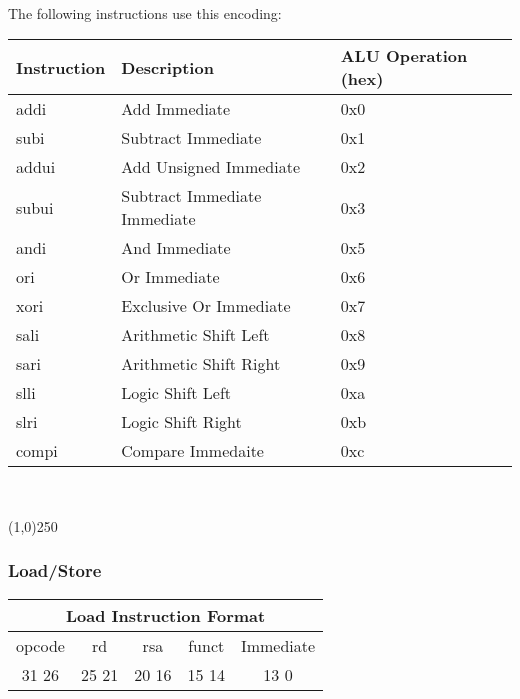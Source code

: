 \documentclass[letterpaper, 11pt]{article}
\begin{document}
\paragraph{}The following instructions use this encoding:
\begin{center}
	\begin{tabular}{|l|l|l|} \hline
			Instruction & Description 						& ALU Operation (hex) \\ \hline
			addi		& Add Immediate						& 0x0 \\ \hline
			subi 		& Subtract Immediate				& 0x1 \\ \hline
			addui 		& Add Unsigned Immediate			& 0x2 \\ \hline
			subui		& Subtract Immediate Immediate 	& 0x3 \\ \hline
			andi		& And Immediate						& 0x5 \\ \hline
			ori			& Or Immediate						& 0x6 \\ \hline
			xori		& Exclusive Or Immediate			& 0x7 \\ \hline
			sali		& Arithmetic Shift Left				& 0x8 \\ \hline
			sari		& Arithmetic Shift Right			& 0x9 \\ \hline
			slli		& Logic Shift Left 					& 0xa \\ \hline
			slri		& Logic Shift Right					& 0xb \\ \hline
			compi		& Compare Immedaite					& 0xc \\ \hline

	\end{tabular} \\
\end{center}
\begin{center}
	\line(1,0){250}
\end{center}

\newpage
\subsubsection{Load/Store}
\begin{center}
		\begin{tabular}{|c|c|c|c|c|}
			\multicolumn{5}{c}{Load Instruction Format}\\ \hline
				\hspace{2pt} opcode \hspace{2pt} & \hspace{5pt} rd \hspace{5pt} &  \hspace{4pt} rsa \hspace{4pt} & \hspace{3pt} funct \hspace{3pt} & \hspace{10pt} Immediate \hspace{10pt}   \\	\hline
				31 \hfill 26& 25 \hfill 21 &20 \hfill  16& 15 \hfill 14  & 13 \hfill 0\\ \hline
		
	\end{tabular}
\end{center}
\end{document}
